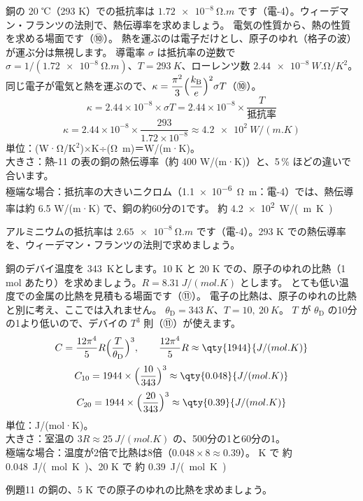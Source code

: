 \label{ph:原-8:ex10}
\begin{phreidai}
銅の 20 ℃（293 K）での抵抗率は $\qty{1.72e-8}{\ohm.m}$ です（電-4）。ウィーデマン・フランツの法則で、熱伝導率を求めましょう。
\phbamen
電気の性質から、熱の性質を求める場面です（⑩）。
\phmushi
熱を運ぶのは電子だけとし、原子のゆれ（格子の波）が運ぶ分は無視します。
\phzu
導電率 $\sigma$ は抵抗率の逆数で $\sigma=1/(\qty{1.72e-8}{\ohm.m})$、$T=\qty{293}{K}$、ローレンツ数 $\qty{2.44e-8}{W.\ohm/K^2}$。
\phriyu
同じ電子が電気と熱を運ぶので、$\kappa=\dfrac{\pi^2}{3}\Bigl(\dfrac{k_{\mathrm B}}{e}\Bigr)^2\sigma T$（⑩）。
\phtateru
\[ \kappa=2.44\times10^{-8}\times\sigma T=2.44\times10^{-8}\times\frac{T}{\text{抵抗率}} \]
\phtoku
\[ \kappa=2.44\times10^{-8}\times\frac{293}{1.72\times10^{-8}}\approx\qty{4.2e2}{W/(m.K)} \]
\phtashikame
単位：(W·\si{\ohm}/K$^2$)×K÷(\si{\ohm.m})＝W/(m·K)。\\
大きさ：熱-11 の表の銅の熱伝導率（約 400 W/(m·K)）と、5\,\% ほどの違いで合います。\\
極端な場合：抵抗率の大きいニクロム（\qty{1.1e-6}{\ohm.m}：電-4）では、熱伝導率は約 6.5 W/(m·K) で、銅の約60分の1です。
\kotae 約 \qty{4.2e2}{W/(m.K)}
\end{phreidai}
\begin{jibun}
アルミニウムの抵抗率は $\qty{2.65e-8}{\ohm.m}$ です（電-4）。293 K での熱伝導率を、ウィーデマン・フランツの法則で求めましょう。
\end{jibun}

\label{ph:原-8:ex11}
\begin{phreidai}
銅のデバイ温度を \qty{343}{K}とします。10 K と 20 K での、原子のゆれの比熱（1 mol あたり）を求めましょう。$R=\qty{8.31}{J/(mol.K)}$ とします。
\phbamen
とても低い温度での金属の比熱を見積もる場面です（⑪）。
\phmushi
電子の比熱は、原子のゆれの比熱と別に考え、ここでは入れません。
\phzu
$\theta_{\mathrm D}=\qty{343}{K}$、$T=10,\ \qty{20}{K}$。
\phriyu
$T$ が $\theta_{\mathrm D}$ の10分の1より低いので、デバイの $T^3$ 則（⑪）が使えます。
\phtateru
\[ C=\frac{12\pi^4}{5}R\Bigl(\frac{T}{\theta_{\mathrm D}}\Bigr)^3,\qquad \frac{12\pi^4}{5}R\approx\qty{1944}{J/(mol.K)} \]
\phtoku
\[ C_{10}=1944\times\Bigl(\frac{10}{343}\Bigr)^3\approx\qty{0.048}{J/(mol.K)} \]
\[ C_{20}=1944\times\Bigl(\frac{20}{343}\Bigr)^3\approx\qty{0.39}{J/(mol.K)} \]
\phtashikame
単位：J/(mol·K)。\\
大きさ：室温の $3R\approx\qty{25}{J/(mol.K)}$ の、500分の1と60分の1。\\
極端な場合：温度が2倍で比熱は8倍（$0.048\times8\approx0.39$）。
 K で 約 \qty{0.048}{J/(mol.K)}、20 K で 約 \qty{0.39}{J/(mol.K)}
\end{phreidai}
\begin{jibun}
例題11 の銅の、5 K での原子のゆれの比熱を求めましょう。
\end{jibun}

